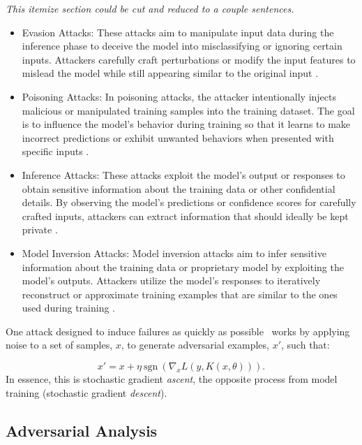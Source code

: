 \documentclass[conference]{IEEEtran}
\newcommand{\cm}[1]{\textit{{\color{blue}#1}}}
\begin{document}
\cm{This itemize section could be cut and reduced to a couple sentences.}
\begin{itemize}
    \item Evasion Attacks: These attacks aim to manipulate input data during the inference phase to deceive the model into misclassifying or ignoring certain inputs. Attackers carefully craft perturbations or modify the input features to mislead the model while still appearing similar to the original input \cite{biggio_evasion_2013, carlini_towards_2017, adversarialpatch, pixelattack, hopskipjump}.
    \item Poisoning Attacks: In poisoning attacks, the attacker intentionally injects malicious or manipulated training samples into the training dataset. The goal is to influence the model's behavior during training so that it learns to make incorrect predictions or exhibit unwanted behaviors when presented with specific inputs \cite{biggio_poisoning_2013, saha2020hidden}.
    \item Inference Attacks: These attacks exploit the model's output or responses to obtain sensitive information about the training data or other confidential details. By observing the model's predictions or confidence scores for carefully crafted inputs, attackers can extract information that should ideally be kept private \cite{chakraborty_adversarial_2018, orekondy2019knockoff}.
    \item Model Inversion Attacks: Model inversion attacks aim to infer sensitive information about the training data or proprietary model by exploiting the model's outputs. Attackers utilize the model's responses to iteratively reconstruct or approximate training examples that are similar to the ones used during training \cite{chakraborty_adversarial_2018, choquette2021label, li2021membership}.
\end{itemize}
One attack designed to induce failures as quickly as possible~\cite{fgm} works by applying noise to a set of samples, $x$, to generate adversarial examples, $x'$, such that:

\begin{equation}
x' = x + \eta \mathrm{~sgn~}(\nabla_x L(y, K(x, \theta))).
\label{eq:fgm}
\end{equation}
In essence, this is stochastic gradient \textit{ascent}, the opposite process from model training (stochastic gradient \textit{descent}).

\subsection{Adversarial Analysis}
\end{document}
